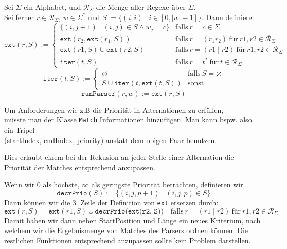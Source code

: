 \documentclass[a4paper,graphics,11pt]{article}
\begin{document}
Sei $\Sigma$ ein Alphabet, und $\mathcal{R}_\Sigma$ die Menge aller Regexe über $\Sigma$.\\
Sei ferner $r \in \mathcal{R}_\Sigma$, $w \in \Sigma^*$ und $S := \{(i,i) \mid i \in [0, |w|-1]\}$. Dann definiere:
$$
    \texttt{ext}(r, S) := \begin{cases}
        \{(i, j+1) \mid (i,j) \in S \land w_j = c\} & \text{falls}\ r = c \in \Sigma\\
        \texttt{ext}(r_2, \texttt{ext}(r_1, S))     & \text{falls}\ r = (r_1r_2)\ \text{für}\ r1,r2 \in \mathcal{R}_\Sigma\\
        \texttt{ext}(r1, S) \cup \texttt{ext}(r2,S) & \text{falls}\ r = (r1 \mid r2)\ \text{für}\ r1,r2 \in \mathcal{R}_\Sigma\\
        \texttt{iter}(t, S)                        & \text{falls}\ r = t^*\ \text{für}\ t \in \mathcal{R}_\Sigma
    \end{cases}
$$$$
    \texttt{iter}(t, S) := \begin{cases}
        \varnothing & \text{falls}\ S = \varnothing\\
        S \cup \texttt{iter}(t, \texttt{ext}(t, S)) & \text{sonst}
    \end{cases}
$$$$
    \texttt{runParser}(r,w) := \texttt{ext}(r, S)
$$

Um Anforderungen wie z.B die Priorität in Alternationen zu erfüllen,\\
müsste man der Klasse \texttt{Match} Informationen hinzufügen.
Man kann bspw. also ein Tripel\\ (startIndex, endIndex, priority) anstatt dem obigen Paar benutzen.

Dies erlaubt einem bei der Rekusion an jeder Stelle einer Alternation die Priorität der Matches entsprechend anzupassen.

Wenn wir 0 als höchste, $\infty$ als geringste Priorität betrachten, definieren wir
$$
    \texttt{decrPrio}(S) := \{(i,j,p+1) \mid (i,j,p) \in S\}
$$
Dann können wir die 3. Zeile der Definition von \texttt{ext} ersetzen durch:
$$
    \texttt{ext}(r, S)
    = \texttt{ext}(r1, S) \cup \texttt{decrPrio}(\texttt{ext(r2, S))}
    \quad \text{falls}\ r = (r1\mid r2)\ \text{für}\ r1,r2 \in \mathcal{R}_\Sigma
$$
Damit haben wir dann neben StartPosition und Länge ein neues Kriterium,
nach welchem wir die Ergebnismenge von Matches des Parsers ordnen können.
Die restlichen Funktionen entsprechend anzupassen sollte kein Problem darstellen.
\end{document}
